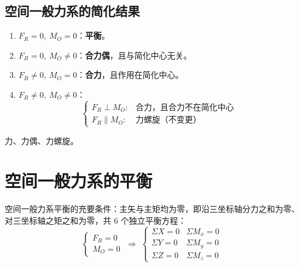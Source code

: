 \subsection{空间一般力系的简化结果}

\begin{enumerate}
\item $F_R=0,\ M_O=0$：\textbf{平衡}。
\item $F_R=0,\ M_O\ne0$：\textbf{合力偶}，且与简化中心无关。
\item $F_R\ne0,\ M_O=0$：\textbf{合力}，且作用在简化中心。
\item $F_R\ne0,\ M_O\ne0$：
\begin{equation}
\begin{cases}
F_R\perp M_O: & \text{合力，且合力不在简化中心}\\
F_R\parallel M_O: & \text{力螺旋（不变更）}
\end{cases}
\label{eq:3-简化-结果}
\end{equation}
\end{enumerate}

 力、力偶、力螺旋。

\section{空间一般力系的平衡}

空间一般力系平衡的充要条件：主矢与主矩均为零，即沿三坐标轴分力之和为零、对三坐标轴之矩之和为零，共 6 个独立平衡方程：
\begin{equation}
\begin{cases}
F_R=0\\ M_O=0
\end{cases}
\;\Longrightarrow\;
\begin{cases}
\Sigma X=0 & \Sigma M_x=0\\
\Sigma Y=0 & \Sigma M_y=0\\
\Sigma Z=0 & \Sigma M_z=0
\end{cases}
\label{eq:3-平衡-充要}
\end{equation}

